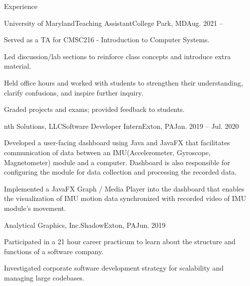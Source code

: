 \documentclass{article}
\newlength{\tabin}
\newlength{\secsep}
\newcommand{\lineunder}{\vspace*{-8pt} \\ \hspace*{-6pt} \hrulefill \\ \vspace*{-15pt}}
\newenvironment{tabbedsection}[1]{
  \begin{list}{}{
      \setlength{\itemsep}{0pt}
      \setlength{\labelsep}{0pt}
      \setlength{\labelwidth}{0pt}
      \setlength{\leftmargin}{\tabin}
      \setlength{\rightmargin}{\tabin}
      \setlength{\listparindent}{0pt}
      \setlength{\parsep}{0pt}
      \setlength{\parskip}{0pt}
      \setlength{\partopsep}{0pt}
      \setlength{\topsep}{#1}
    }
  \item[]
}{\end{list}}
\newenvironment{resume_section}[1]{
  \filbreak
  \vspace{2\secsep}
  \textsc{\large#1}
  \lineunder
  \begin{tabbedsection}{\secsep}
}{\end{tabbedsection}}
\newenvironment{subitems}{
  \renewcommand{\labelitemi}{-}
  \begin{itemize}
      \setlength{\labelsep}{1em}
}{\end{itemize}}
\newenvironment{resume_employer}[4]{
  \vspace{\secsep}
  \textbf{#1} \\ 
  \indent {\small #2} \hfill {\footnotesize#3 (#4)} \hspace{-4em}
  \begin{tabbedsection}{0pt}
  \begin{subitems}
}{\end{subitems}\end{tabbedsection}}
\begin{document}
\begin{resume_section}{Experience}
\begin{resume_employer}{University of Maryland}{Teaching Assistant}{College Park, MD}{Aug. 2021 -- }
	\item Served as a TA for CMSC216 - Introduction to Computer Systems.
	\item Led discussion/lab sections to reinforce class concepts and introduce extra material.
	\item Held office hours and worked with students to strengthen their understanding, clarify confusions, and inspire further inquiry.
	\item Graded projects and exams; provided feedback to students.
\end{resume_employer}
  \begin{resume_employer}{nth Solutions, LLC}{Software Developer Intern}{Exton, PA}{Jan. 2019 -- Jul. 2020}
    \item Developed a user-facing dashboard using Java and JavaFX that facilitates communication of data between an IMU(Accelerometer, Gyroscope, Magnetometer) module and a computer. Dashboard is also responsible for configuring the module for data collection and processing the recorded data.
    \item Implemented a JavaFX Graph / Media Player into the dashboard that enables the visualization of IMU motion data synchronized with recorded video of IMU module's movement.
  \end{resume_employer}
  
  \begin{resume_employer}{Analytical Graphics, Inc.}{Shadow}{Exton, PA}{Jun. 2019}
    \item Participated in a 21 hour career practicum to learn about the structure and functions of a software company.
    \item Investigated corporate software development strategy for scalability and managing large codebases.
  \end{resume_employer}
\end{resume_section}
\end{document}
